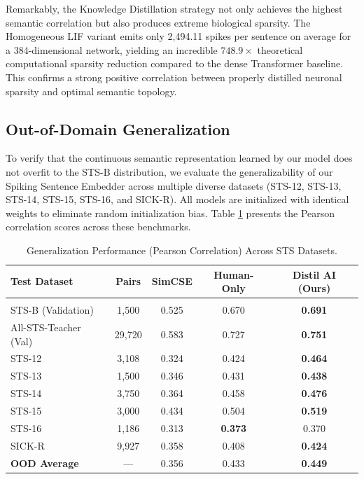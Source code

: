 \documentclass{article} %
\begin{document}
Remarkably, the Knowledge Distillation strategy not only achieves the highest semantic correlation but also produces extreme biological sparsity. The Homogeneous LIF variant emits only 2,494.11 spikes per sentence on average for a 384-dimensional network, yielding an incredible $748.9\times$ theoretical computational sparsity reduction compared to the dense Transformer baseline. This confirms a strong positive correlation between properly distilled neuronal sparsity and optimal semantic topology.

\subsection{Out-of-Domain Generalization}
To verify that the continuous semantic representation learned by our model does not overfit to the STS-B distribution, we evaluate the generalizability of our Spiking Sentence Embedder across multiple diverse datasets (STS-12, STS-13, STS-14, STS-15, STS-16, and SICK-R). All models are initialized with identical weights to eliminate random initialization bias. Table \ref{tab:generalization} presents the Pearson correlation scores across these benchmarks.

\begin{table}[h]
\caption{Generalization Performance (Pearson Correlation) Across STS Datasets.}
\label{tab:generalization}
\begin{center}
\begin{tabular}{lcccc}
\multicolumn{1}{l}{\bf Test Dataset} & \multicolumn{1}{c}{\bf Pairs} & \multicolumn{1}{c}{\bf SimCSE} & \multicolumn{1}{c}{\bf Human-Only} & \multicolumn{1}{c}{\bf Distil AI (Ours)} \\
\hline \\
STS-B (Validation) & 1,500 & 0.525 & 0.670 & \textbf{0.691} \\
All-STS-Teacher (Val) & 29,720 & 0.583 & 0.727 & \textbf{0.751} \\
\hline
STS-12             & 3,108 & 0.324 & 0.424 & \textbf{0.464} \\
STS-13             & 1,500 & 0.346 & 0.431 & \textbf{0.438} \\
STS-14             & 3,750 & 0.364 & 0.458 & \textbf{0.476} \\
STS-15             & 3,000 & 0.434 & 0.504 & \textbf{0.519} \\
STS-16             & 1,186 & 0.313 & \textbf{0.373} & 0.370 \\
SICK-R             & 9,927 & 0.358 & 0.408 & \textbf{0.424} \\
\hline
\textbf{OOD Average} & --- & 0.356 & 0.433 & \textbf{0.449} \\
\end{tabular}
\end{center}
\end{table}
\end{document}
